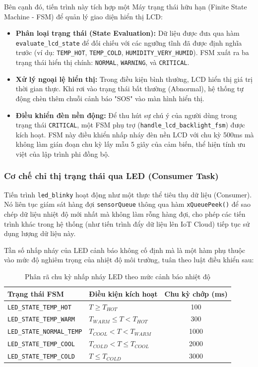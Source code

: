 Bên cạnh đó, tiến trình này tích hợp một Máy trạng thái hữu hạn (Finite State Machine - FSM) để quản lý giao diện hiển thị LCD:
\begin{itemize}
    \item \textbf{Phân loại trạng thái (State Evaluation):} Dữ liệu được đưa qua hàm \texttt{evaluate\_lcd\_state} để đối chiếu với các ngưỡng tĩnh đã được định nghĩa trước (ví dụ: \texttt{TEMP\_HOT}, \texttt{TEMP\_COLD}, \texttt{HUMIDITY\_VERY\_HUMID}). FSM xuất ra ba trạng thái hiển thị chính: \texttt{NORMAL}, \texttt{WARNING}, và \texttt{CRITICAL}.
    \item \textbf{Xử lý ngoại lệ hiển thị:} Trong điều kiện bình thường, LCD hiển thị giá trị thời gian thực. Khi rơi vào trạng thái bất thường (Abnormal), hệ thống tự động chèn thêm chuỗi cảnh báo "SOS" vào màn hình hiển thị.
    \item \textbf{Điều khiển đèn nền động:} Để thu hút sự chú ý của người dùng trong trạng thái \texttt{CRITICAL}, một FSM phụ trợ (\texttt{handle\_lcd\_backlight\_fsm}) được kích hoạt. FSM này điều khiển nhấp nháy đèn nền LCD với chu kỳ 500ms mà không làm gián đoạn chu kỳ lấy mẫu 5 giây của cảm biến, thể hiện tính ưu việt của lập trình phi đồng bộ.
\end{itemize}

\subsubsection{Cơ chế chỉ thị trạng thái qua LED (Consumer Task)}
Tiến trình \texttt{led\_blinky} hoạt động như một thực thể tiêu thụ dữ liệu (Consumer). Nó liên tục giám sát hàng đợi \texttt{sensorQueue} thông qua hàm \texttt{xQueuePeek()} để sao chép dữ liệu nhiệt độ mới nhất mà không làm rỗng hàng đợi, cho phép các tiến trình khác trong hệ thống (như tiến trình đẩy dữ liệu lên IoT Cloud) tiếp tục sử dụng lượng dữ liệu này.

Tần số nhấp nháy của LED cảnh báo không cố định mà là một hàm phụ thuộc vào mức độ nghiêm trọng của nhiệt độ môi trường, tuân theo luật điều khiển sau:
\begin{table}[H]
    \centering
    \caption{Phân rã chu kỳ nhấp nháy LED theo mức cảnh báo nhiệt độ}
    \label{tab:led_intervals}
    \begin{tabular}{|l|l|c|}
    \hline
    \textbf{Trạng thái FSM} & \textbf{Điều kiện kích hoạt} & \textbf{Chu kỳ chớp (ms)} \\ \hline
    \texttt{LED\_STATE\_TEMP\_HOT}  & $T \geq T_{HOT}$ & 100 \\ \hline
    \texttt{LED\_STATE\_TEMP\_WARM} & $T_{WARM} \leq T < T_{HOT}$ & 300 \\ \hline
    \texttt{LED\_STATE\_NORMAL\_TEMP} & $T_{COOL} < T < T_{WARM}$ & 1000 \\ \hline
    \texttt{LED\_STATE\_TEMP\_COOL} & $T_{COLD} < T \leq T_{COOL}$ & 2000 \\ \hline
    \texttt{LED\_STATE\_TEMP\_COLD} & $T \leq T_{COLD}$ & 3000 \\ \hline
    \end{tabular}
\end{table}

